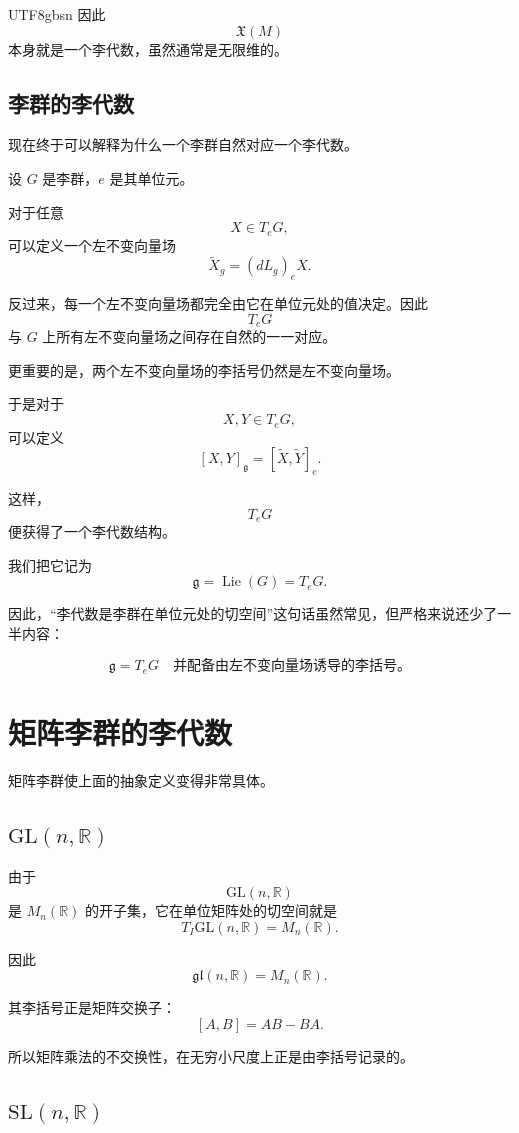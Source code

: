\documentclass[11pt]{article}
\begin{document}
\begin{CJK*}{UTF8}{gbsn}
因此
\[
\mathfrak{X}(M)
\]
本身就是一个李代数，虽然通常是无限维的。


\subsection{李群的李代数}

现在终于可以解释为什么一个李群自然对应一个李代数。

设 $G$ 是李群，$e$ 是其单位元。

对于任意
\[
X\in T_eG,
\]
可以定义一个左不变向量场
\[
\widetilde{X}_g
=
(dL_g)_eX.
\]

反过来，每一个左不变向量场都完全由它在单位元处的值决定。因此
\[
T_eG
\]
与 $G$ 上所有左不变向量场之间存在自然的一一对应。

更重要的是，两个左不变向量场的李括号仍然是左不变向量场。

于是对于
\[
X,Y\in T_eG,
\]
可以定义
\[
[X,Y]_{\mathfrak g}
=
[\widetilde X,\widetilde Y]_e.
\]

这样，
\[
T_eG
\]
便获得了一个李代数结构。

我们把它记为
\[
\mathfrak g
=
\operatorname{Lie}(G)
=
T_eG.
\]

因此，“李代数是李群在单位元处的切空间”这句话虽然常见，但严格来说还少了一半内容：

\[
\boxed{
\mathfrak g=T_eG
\quad
\text{并配备由左不变向量场诱导的李括号。}
}
\]


\section{矩阵李群的李代数}

矩阵李群使上面的抽象定义变得非常具体。

\subsection{$\mathrm{GL}(n,\mathbb{R})$}

由于
\[
\mathrm{GL}(n,\mathbb{R})
\]
是 $M_n(\mathbb{R})$ 的开子集，它在单位矩阵处的切空间就是
\[
T_I\mathrm{GL}(n,\mathbb{R})
=
M_n(\mathbb{R}).
\]

因此
\[
\mathfrak{gl}(n,\mathbb{R})
=
M_n(\mathbb{R}).
\]

其李括号正是矩阵交换子：
\[
[A,B]
=
AB-BA.
\]

所以矩阵乘法的不交换性，在无穷小尺度上正是由李括号记录的。


\subsection{$\mathrm{SL}(n,\mathbb{R})$}


\end{CJK*}
\end{document}
